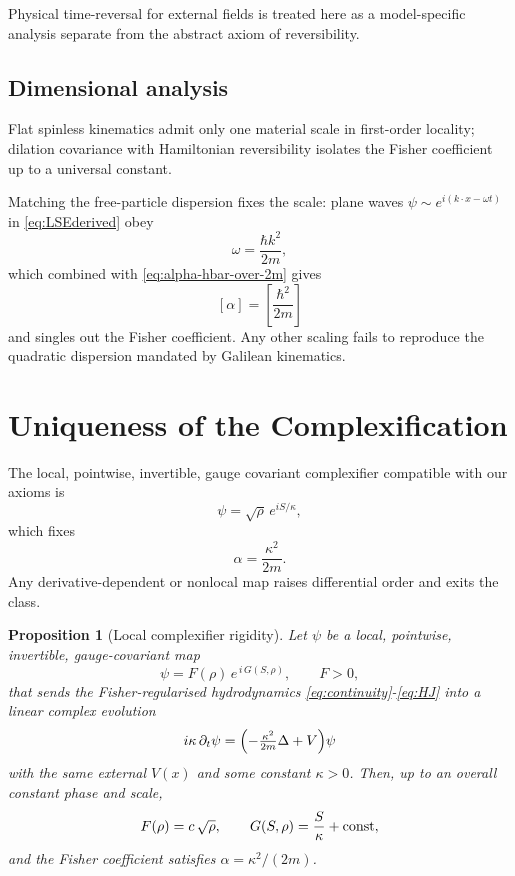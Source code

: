 \documentclass[11pt,a4paper]{article}
\numberwithin{equation}{section}
\theoremstyle{thmcompact}
\newtheorem{proposition}[theorem]{Proposition}
\theoremstyle{remark}
\begin{document}
 Physical time-reversal for external fields is treated here as a model-specific analysis separate from the abstract axiom of reversibility.

\subsection{Dimensional analysis}

Flat spinless kinematics admit only one material scale in first-order locality; dilation covariance with Hamiltonian reversibility isolates the Fisher coefficient up to a universal constant.

Matching the free-particle dispersion fixes the scale: plane waves
\(\psi \sim e^{i(k\cdot x - \omega t)}\) in \eqref{eq:LSEderived} obey
\[
\omega = \frac{\hbar k^{2}}{2m},
\]
which combined with \eqref{eq:alpha-hbar-over-2m} gives
\[
[\alpha] = \left[\frac{\hbar^{2}}{2m}\right]
\]
and singles out the Fisher coefficient. Any other scaling fails to reproduce
the quadratic dispersion mandated by Galilean kinematics.


\section{Uniqueness of the Complexification}
	
The local, pointwise, invertible, gauge covariant complexifier compatible with our axioms is
\[
\psi=\sqrt{\rho}\,e^{iS/\kappa},
\]
which fixes
\[
\alpha=\frac{\kappa^{2}}{2m}.
\]
Any derivative-dependent or nonlocal map raises differential order and exits the
class.
	
\begin{proposition}[Local complexifier rigidity]\label{prop:complexifier-rigidity}
	Let $\psi$ be a \emph{local}, pointwise, invertible, gauge-covariant map
	\[
	\psi=F(\rho)\,e^{\,i\,G(S,\rho)},\qquad F>0,
	\]
	that sends the Fisher-regularised hydrodynamics \eqref{eq:continuity}-\eqref{eq:HJ} into a \emph{linear} complex evolution
	\[
	i\kappa\,\partial_t\psi=\Bigl(-\tfrac{\kappa^2}{2m}\Delta+V\Bigr)\psi
	\]
	with the same external $V(x)$ and some constant $\kappa>0$. Then, up to an overall constant phase and scale,
	\[
	F(\rho)=c\,\sqrt{\rho},\qquad G(S,\rho)=\frac{S}{\kappa}+{\rm const},
	\]
	and the Fisher coefficient satisfies $\alpha=\kappa^2/(2m)$.
\end{proposition}
\end{document}
